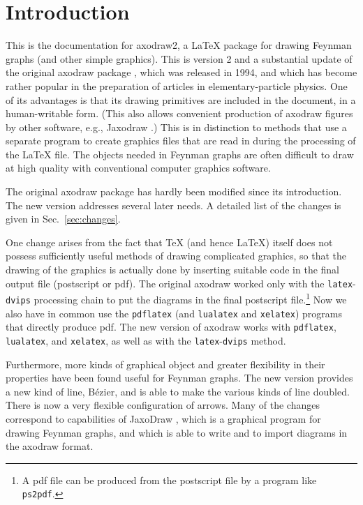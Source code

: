 \documentclass[12pt]{article}
\def\program#1{\texttt{#1}}
\begin{document}
\newpage

\tableofcontents

\newpage


\section{Introduction}
\label{sec:intro}

This is the documentation for axodraw2, a \LaTeX{} package for drawing
Feynman graphs (and other simple graphics).  This is version 2 and a
substantial update of the original axodraw package \cite{axodraw1},
which was released in 1994, and which has become rather popular in the
preparation of articles in elementary-particle physics.  One of its
advantages is that its drawing primitives are included in the
 document, in a human-writable form. (This also allows
convenient production of axodraw figures by other software, e.g.,
Jaxodraw \cite{jaxodraw1,jaxodraw2}.)  This is in distinction to
methods that use a separate program to create graphics files that are
read in during the processing of the \LaTeX{} file.  The objects
needed in Feynman graphs are often difficult to draw at high quality
with conventional computer graphics software.

The original axodraw package has hardly been modified since its
introduction.  The new version addresses several later needs.  A
detailed list of the changes is given in Sec.\ \ref{sec:changes}.

One change arises from the fact that \TeX{} (and hence \LaTeX{})
itself does not possess sufficiently useful methods of drawing
complicated graphics, so that the drawing of the graphics is actually
done by inserting suitable code in the final output file (postscript
or pdf).  The original axodraw worked only with the
\program{latex}-\program{dvips} processing chain to put the diagrams
in the final postscript file.\footnote{A pdf file can be produced from
  the postscript file by a program like \program{ps2pdf}.}  Now we
also have in common use the \program{pdflatex} (and \program{lualatex}
and \program{xelatex}) programs that directly produce pdf.  The new
version of axodraw works with \program{pdflatex}, \program{lualatex},
and \program{xelatex}, as well as with the
\program{latex}-\program{dvips} method.

Furthermore, more kinds of graphical object and greater flexibility in
their properties have been found useful for Feynman graphs.  The new
version provides a new kind of line, B\'ezier, and is able to make the
various kinds of line doubled.  There is now a very flexible
configuration of arrows.  Many of the changes correspond to
capabilities of JaxoDraw \cite{jaxodraw1,jaxodraw2}, which is a
graphical program for drawing Feynman graphs, and which is able to
write and to import diagrams in the axodraw format.
\end{document}
